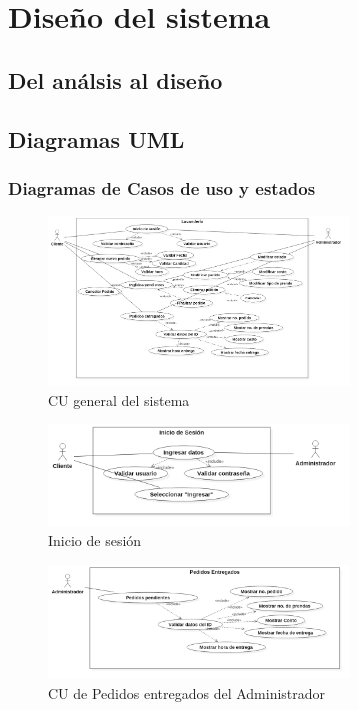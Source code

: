 \section{Diseño del sistema}
\subsection{Del análsis al diseño}

\subsection{Diagramas UML}

\subsubsection{Diagramas de Casos de uso y estados}


\begin{figure}[h]
\begin{center}
\includegraphics[width=8cm]{./imagenes/diagramas/CU_Lavanderia.png}
\end{center}
\caption{CU general del sistema}
\end{figure}


\begin{figure}[h]
\begin{center}
\includegraphics[width=8cm]{./imagenes/diagramas/CU_IniciarSesion.png}
\end{center}
\caption{Inicio de sesión}
\end{figure}


\begin{figure}[h]
\begin{center}
\includegraphics[width=8cm]{./imagenes/diagramas/CU_PedidosEntregados(Admin).png}
\end{center}
\caption{CU de Pedidos entregados del Administrador}
\end{figure}


